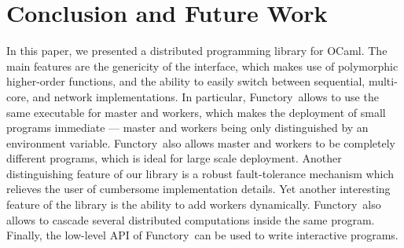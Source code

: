 \documentclass{llncs}
\newcommand{\Ocaml}{OCaml}
\newcommand{\functory}{\textsf{Functory}}
\begin{document}
\section{Conclusion and Future Work}\label{sec:future}

In this paper, we presented a distributed programming library for
\Ocaml. The main features are the
genericity of the interface, which makes use of polymorphic
higher-order functions, and the ability to easily switch between
sequential, multi-core, and network implementations. In particular,
\functory\ allows to use the same executable for master and workers,
which makes the deployment of small programs immediate --- master and
workers being only distinguished by an environment
variable. \functory\ also allows master and workers to be completely
different programs, which is ideal for large scale deployment.
Another distinguishing feature of our library is a robust
fault-tolerance mechanism which relieves the user of cumbersome
implementation details.  Yet another interesting feature of the
library is the ability to add workers dynamically. \functory\
also allows to cascade several distributed computations inside the
same program.  Finally, the low-level API of \functory\ 
can be used to write interactive programs.
\end{document}
